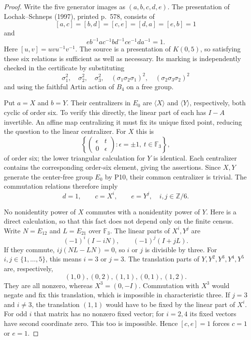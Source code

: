 \begin{proof}
Write the five generator images as $(a,b,c,d,e)$.
The presentation of Lochak--Schneps (1997), printed
p.~578, consists of
\[
 [a,c]=[b,d]=[c,e]=[d,a]=[e,b]=1
\]
and
\[
 e b^{-1}a c^{-1}b d^{-1}c e^{-1}d a^{-1}=1.
                                                        \tag{D23.H11.2}
\]
Here $[u,v]=uvu^{-1}v^{-1}$. The source is a presentation
of $K(0,5)$, so satisfying these six relations is sufficient
as well as necessary. Its marking is independently checked
in the certificate by substituting
\[
 \sigma_1^2,\quad\sigma_2^2,\quad\sigma_3^2,
 \quad(\sigma_1\sigma_2\sigma_1)^2,
 \quad(\sigma_2\sigma_3\sigma_2)^2
\]
and using the faithful Artin action of $B_4$ on a free group.

Put $a=X$ and $b=Y$. Their centralizers in $E_0$ are
$\langle X\rangle$ and $\langle Y\rangle$, respectively,
both cyclic of order six. To verify this directly, the
linear part of each has $I-A$ invertible. An affine map
centralizing it must fix its unique fixed point, reducing
the question to the linear centralizer. For $X$ this is
\[
 \left\{\begin{pmatrix}\epsilon&t\\0&\epsilon\end{pmatrix}:
        \epsilon=\pm1,\ t\in\mathbb F_3\right\},
\]
of order six; the lower triangular calculation for $Y$
is identical. Each centralizer contains the corresponding
order-six element, giving the assertions.
Since $X,Y$ generate the center-free group $E_0$ by P10,
their common centralizer is trivial. The commutation
relations therefore imply
\[
            d=1,\qquad c=X^i,\qquad e=Y^j,
             \quad i,j\in\mathbb Z/6.
                                                        \tag{D23.H11.3}
\]

No nonidentity power of $X$ commutes with a nonidentity
power of $Y$. Here is a direct calculation, so that this
fact does not depend only on the finite census.
Write $N=E_{12}$ and $L=E_{21}$ over $\mathbb F_3$.
The linear parts of $X^i,Y^j$ are
\[
             (-1)^i(I-iN),\qquad(-1)^j(I+jL).
\]
If they commute, $ij(NL-LN)=0$, so $i$ or $j$ is
divisible by three. For $i,j\in\{1,\ldots,5\}$,
this means $i=3$ or $j=3$.
The translation parts of $Y,Y^2,Y^3,Y^4,Y^5$ are,
respectively,
\[
                  (1,0),(0,2),(1,1),(0,1),(1,2).
\]
They are all nonzero, whereas $X^3=(0,-I)$.
Commutation with $X^3$ would negate and fix this translation,
which is impossible in characteristic three. If $j=3$
and $i\ne3$, the translation $(1,1)$ would have to be
fixed by the linear part of $X^i$. For odd $i$ that matrix
has no nonzero fixed vector; for $i=2,4$ its fixed vectors
have second coordinate zero. This too is impossible.
Hence $[c,e]=1$ forces $c=1$ or $e=1$.


\end{proof}
